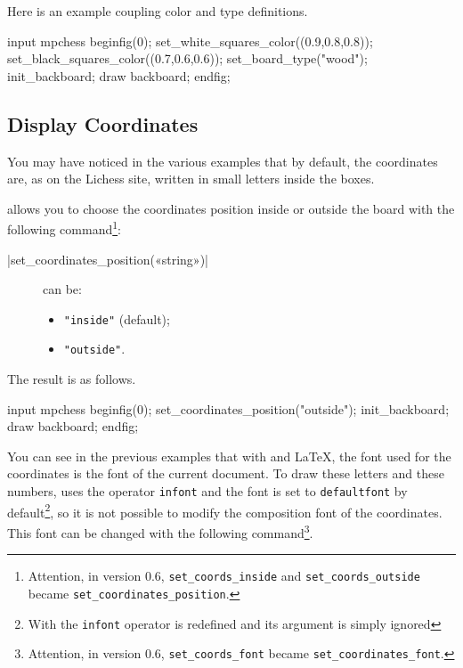 \documentclass[english]{ltxdoc}
\begin{document}
Here is an example coupling color and type definitions. 

\begin{ExempleMP}
input mpchess
beginfig(0);
set_white_squares_color((0.9,0.8,0.8));
set_black_squares_color((0.7,0.6,0.6));
set_board_type("wood");
init_backboard;
draw backboard;
endfig;
\end{ExempleMP}
  


\subsection{Display Coordinates}

You may have noticed in the various examples that by default, the coordinates are, as on the Lichess site, written in small letters inside the boxes.

\mpchess allows you to choose the coordinates position inside  or outside the board with the
following command\footnote{Attention,
in version 0.6, \lstinline+set_coords_inside+ and \lstinline+set_coords_outside+ became
\lstinline+set_coordinates_position+.}:

\commande|set_coordinates_position(«string»)|\smallskip


\begin{description}
  \item[] can be:
\begin{itemize}
\item \lstinline+"inside"+ (default);
\item \lstinline+"outside"+.
\end{itemize}
\end{description}

The result is as follows.



\begin{ExempleMP}
input mpchess
beginfig(0);
set_coordinates_position("outside");
init_backboard;
draw backboard;
endfig;
\end{ExempleMP}


You can see in the previous examples that with  and
\LaTeX, the font used for the coordinates is the font of the current document. To draw these letters and
these numbers, \mpchess uses the \MP{} operator  \lstinline+infont+ and the font
is set to \lstinline+defaultfont+ by default\footnote{With 
the \lstinline+infont+ operator is redefined and its argument is simply
ignored}, so it is not possible to modify the composition font of the
coordinates. This font can be changed with the following command\footnote{Attention,
in version 0.6, \lstinline+set_coords_font+ became 
\lstinline+set_coordinates_font+.}.
\end{document}
